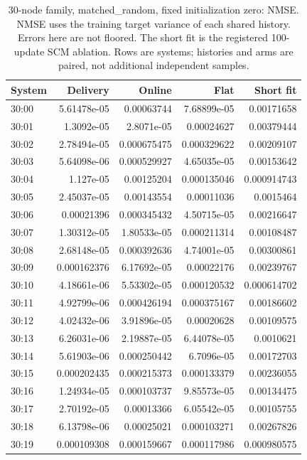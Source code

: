 \begin{table}[ht]
\centering\scriptsize
\begin{tabular}{lrrrr}
\toprule
System & Delivery & Online & Flat & Short fit\\
\midrule
30:00 & 5.61478e-05 & 0.00063744 & 7.68899e-05 & 0.00171658\\
30:01 & 1.3092e-05 & 2.8071e-05 & 0.00024627 & 0.00379444\\
30:02 & 2.78494e-05 & 0.000675475 & 0.000329622 & 0.00209107\\
30:03 & 5.64098e-06 & 0.000529927 & 4.65035e-05 & 0.00153642\\
30:04 & 1.127e-05 & 0.00125204 & 0.000135046 & 0.000914743\\
30:05 & 2.45037e-05 & 0.00143554 & 0.00011036 & 0.0015464\\
30:06 & 0.00021396 & 0.000345432 & 4.50715e-05 & 0.00216647\\
30:07 & 1.30312e-05 & 1.80533e-05 & 0.000211314 & 0.00108487\\
30:08 & 2.68148e-05 & 0.000392636 & 4.74001e-05 & 0.00300861\\
30:09 & 0.000162376 & 6.17692e-05 & 0.00022176 & 0.00239767\\
30:10 & 4.18661e-06 & 5.53302e-05 & 0.000120532 & 0.000614702\\
30:11 & 4.92799e-06 & 0.000426194 & 0.000375167 & 0.00186602\\
30:12 & 4.02432e-06 & 3.91896e-05 & 0.00020628 & 0.00109575\\
30:13 & 6.26031e-06 & 2.19887e-05 & 6.44078e-05 & 0.0010621\\
30:14 & 5.61903e-06 & 0.000250442 & 6.7096e-05 & 0.00172703\\
30:15 & 0.000202435 & 0.000215373 & 0.000133379 & 0.00236055\\
30:16 & 1.24934e-05 & 0.000103737 & 9.85573e-05 & 0.00134475\\
30:17 & 2.70192e-05 & 0.00013366 & 6.05542e-05 & 0.00105755\\
30:18 & 6.13798e-06 & 0.00025021 & 0.000103271 & 0.00267826\\
30:19 & 0.000109308 & 0.000159667 & 0.000117986 & 0.000980575\\
\bottomrule
\end{tabular}
\caption{30-node family, matched\_random, fixed initialization zero: NMSE. NMSE uses the training target variance of each shared history. Errors here are not floored. The short fit is the registered 100-update SCM ablation. Rows are systems; histories and arms are paired, not additional independent samples.}
\end{table}
